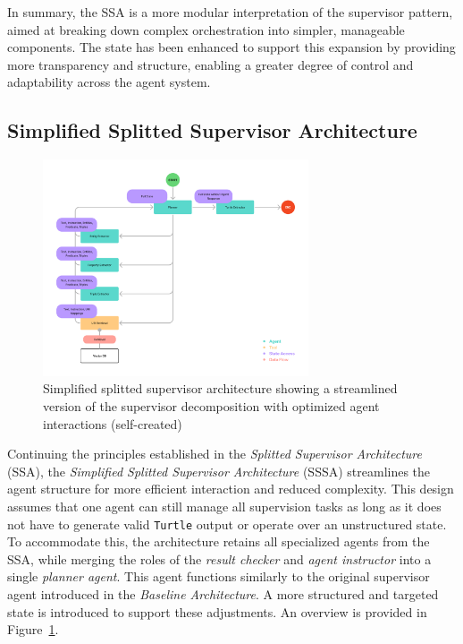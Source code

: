 \documentclass[a4paper,oneside,bibliography=totoc]{scrbook}
\begin{document}
In summary, the \ac{SSA} is a more modular interpretation of the supervisor pattern, aimed at breaking down complex orchestration into simpler, manageable components. The state has been enhanced to support this expansion by providing more transparency and structure, enabling a greater degree of control and adaptability across the agent system.

\subsection{Simplified Splitted Supervisor Architecture}
\label{subsec:simplified_splitted_supervisor}

\begin{figure}[tp]
  \centering
  \includegraphics[width=0.7\textwidth]{figures/Simplified Splitted Supervisor Architecture.png}
  \caption[Simplified splitted supervisor architecture showing a streamlined version of the supervisor decomposition with optimized agent interactions]{Simplified splitted supervisor architecture showing a streamlined version of the supervisor decomposition with optimized agent interactions (self-created)}
  \label{fig:simplified_splitted_supervisor_architecture}
\end{figure}

Continuing the principles established in the \textit{Splitted Supervisor Architecture} (\ac{SSA}), the \textit{Simplified Splitted Supervisor Architecture} (\ac{SSSA}) streamlines the agent structure for more efficient interaction and reduced complexity. This design assumes that one agent can still manage all supervision tasks as long as it does not have to generate valid \texttt{Turtle} output or operate over an unstructured state. To accommodate this, the architecture retains all specialized agents from the \ac{SSA}, while merging the roles of the \textit{result checker} and \textit{agent instructor} into a single \textit{planner agent}. This agent functions similarly to the original supervisor agent introduced in the \textit{Baseline Architecture}. A more structured and targeted state is introduced to support these adjustments. An overview is provided in Figure~\ref{fig:simplified_splitted_supervisor_architecture}.
\end{document}
